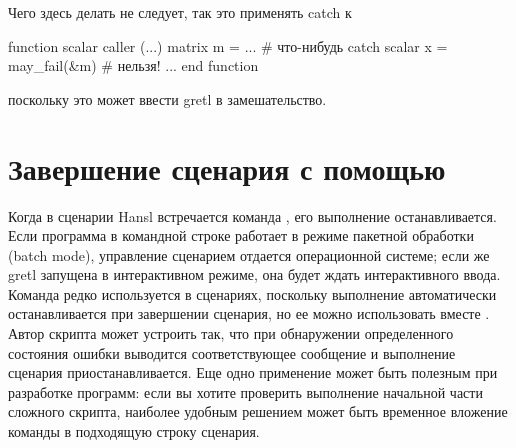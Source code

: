 
Чего здесь делать не следует, так это применять catch к

\begin{code}
function scalar caller (...)
  matrix m = ... # что-нибудь
  catch scalar x = may_fail(&m) # нельзя!
  ...
end function
\end{code}

поскольку это может ввести gretl в замешательство.

\section{Завершение сценария с помощью }

Когда в сценарии Hansl встречается команда , его выполнение
останавливается. Если программа  в командной строке
работает в режиме пакетной обработки (batch mode), управление
сценарием отдается операционной системе; если же gretl запущена в
интерактивном режиме, она будет ждать интерактивного ввода.  Команда
 редко используется в сценариях, поскольку выполнение
автоматически останавливается при завершении сценария, но ее можно
использовать вместе . Автор скрипта может устроить так, что
при обнаружении определенного состояния ошибки выводится
соответствующее сообщение и выполнение сценария
приостанавливается. Еще одно применение  может быть полезным
при разработке программ: если вы хотите проверить выполнение начальной
части сложного скрипта, наиболее удобным решением может быть временное
вложение команды  в подходящую строку сценария.

